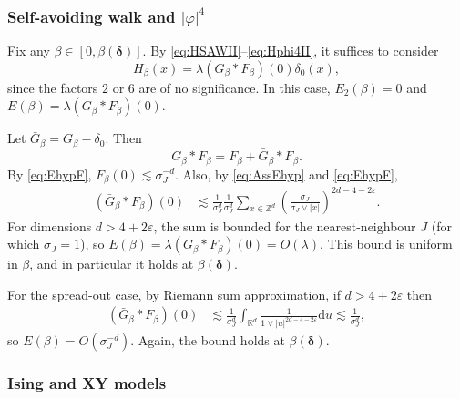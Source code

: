 \documentclass[11pt,a4paper]{article}
\numberwithin{equation}{section}
\theoremstyle{plain}
\theoremstyle{definition}
\newcommand\1{\mathds{1}}
\newcommand{\deltamain}{\boldsymbol{\delta}}
\begin{document}
\subsubsection{Self-avoiding walk and $|\varphi|^4$}
\label{sec:SAWII}

Fix any $\beta \in [0,\beta(\deltamain)]$.
By \eqref{eq:HSAWII}--\eqref{eq:Hphi4II}, it suffices to consider
\begin{equation}
	H_\beta(x) =\lambda  (G_\beta*F_\beta)(0)  \delta_{0}(x) ,
\end{equation}
since the factors $2$ or $6$ are of no significance.
In this case, $E_2(\beta)=0$ and
$E(\beta)= \lambda (G_\beta*F_\beta)(0)$.

Let $\bar G_\beta = G_\beta -\delta_0$.  Then
\begin{equation}
    G_\beta*F_\beta = F_\beta + \bar G_\beta*F_\beta.
\end{equation}
By \eqref{eq:EhypF}, $F_\beta(0)\lesssim \sigma_J^{-d}$.
Also, by \eqref{eq:AssEhyp} and \eqref{eq:EhypF},
\begin{align}
    (\bar G_\beta*F_\beta) (0)
    & \lesssim
    \frac{1}{\sigma_J^d}\frac{1}{\sigma_J^d}
    \sum_{x\in \mathbb Z^d}
    \left(\frac{\sigma_J}{\sigma_J \vee|x|} \right)^{2d-4-2\varepsilon}.
\end{align}
For dimensions $d>4+2\varepsilon$,
the sum is bounded for the nearest-neighbour $J$ (for which $\sigma_J=1$), so $E(\beta) =
\lambda
(G_\beta*F_\beta)(0) = O(\lambda)$.
This bound is uniform in $\beta$, and in particular it holds at
$\beta(\deltamain)$.

For the spread-out case, by Riemann sum approximation,
if $d>4+2\varepsilon$ then
\begin{align}
\label{eq:ESAWbd}
    (\bar G_\beta*F_\beta) (0)
    & \lesssim
    \frac{1}{\sigma_J^d}
    \int_{\mathbb R^d} \frac{1}{1\vee |u|^{2d-4-2\varepsilon}} \mathrm{d}u
    \lesssim
    \frac{1}{\sigma_J^d}
    ,
\end{align}
so $E(\beta)=O(\sigma_J^{-d})$.  Again, the bound holds at
$\beta(\deltamain)$.

\subsubsection{Ising and XY models}
\end{document}
